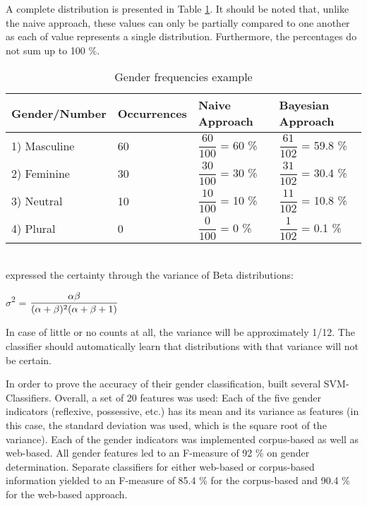 A complete distribution is presented in Table \ref{table:bergsma2004GenderFreqTable}. It should be noted that, unlike the naive approach, these values can only be partially compared to one another as each of value represents a single distribution. Furthermore, the percentages do not sum up to 100 \%.

\begin{table}[h]
      \caption{Gender frequencies example}
	\centering
    \renewcommand{\arraystretch}{2.0}
    \begin{tabular}{| l | l | l | l |}
    \hline
    Gender/Number & Occurrences & Naive Approach & Bayesian Approach \\ \hline
\hline
    1) Masculine & 60 & $\dfrac{60}{100}$ = 60 \% &  $\dfrac{61}{102}$ = 59.8 \% \\ \hline
    2) Feminine & 30 &  $\dfrac{30}{100}$ = 30 \% &  $\dfrac{31}{102}$ = 30.4 \% \\ \hline
    3) Neutral & 10 & $\dfrac{10}{100}$ = 10 \% & $\dfrac{11}{102}$ = 10.8 \%  \\ \hline
    4) Plural & 0 &    $\dfrac{0}{100}$ =  0 \% &  $\dfrac{1}{102}$ = 0.1 \% \\ \hline
    \end{tabular}

     \label{table:bergsma2004GenderFreqTable}
\end{table}
~\\

\cite{bergsma2005automatic} expressed the certainty through the variance of Beta distributions:

\begin{center}
	$\sigma$\textsuperscript{2} =  $\dfrac{\alpha \beta }{(\alpha + \beta)\textsuperscript{2}(\alpha + \beta + 1)}$
\end{center}

In case of little or no counts at all, the variance will be approximately 1/12. The classifier should automatically learn that distributions with that variance will not be certain.

In order to prove the accuracy of their gender classification, \cite{bergsma2005automatic} built several SVM-Classifiers. Overall, a set of 20 features was used: Each of the five gender indicators (reflexive, possessive, etc.) has its mean and its variance as features (in this case, the standard deviation was used, which is the square root of the variance). Each of the gender indicators was implemented corpus-based as well as web-based. All gender features led to an F-measure of 92 \% on gender determination. Separate classifiers for either web-based or corpus-based information yielded to an F-measure of 85.4 \% for the corpus-based and 90.4 \% for the web-based approach.

